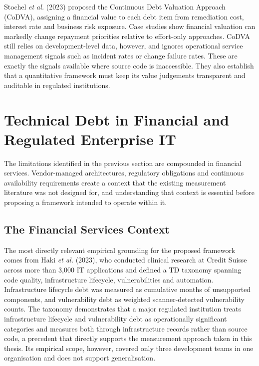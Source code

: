 \documentclass[
  12pt,
  letterpaper,
  12pt,
  oneside,
  english,
  onehalfspacing,
  headsepline]{MastersDoctoralThesis}
\begin{document}
Stochel \emph{et al.} (2023) proposed the Continuous Debt Valuation
Approach (CoDVA), assigning a financial value to each debt item from
remediation cost, interest rate and business risk exposure. Case studies
show financial valuation can markedly change repayment priorities
relative to effort-only approaches. CoDVA still relies on
development-level data, however, and ignores operational service
management signals such as incident rates or change failure rates. These
are exactly the signals available where source code is inaccessible.
They also establish that a quantitative framework must keep its value
judgements transparent and auditable in regulated institutions.

\section{Technical Debt in Financial and Regulated Enterprise
IT}\label{technical-debt-in-financial-and-regulated-enterprise-it}

The limitations identified in the previous section are compounded in
financial services. Vendor-managed architectures, regulatory obligations
and continuous availability requirements create a context that the
existing measurement literature was not designed for, and understanding
that context is essential before proposing a framework intended to
operate within it.

\subsection{The Financial Services
Context}\label{the-financial-services-context}

The most directly relevant empirical grounding for the proposed
framework comes from Haki \emph{et al.} (2023), who conducted clinical
research at Credit Suisse across more than 3,000 IT applications and
defined a TD taxonomy spanning code quality, infrastructure lifecycle,
vulnerabilities and automation. Infrastructure lifecycle debt was
measured as cumulative months of unsupported components, and
vulnerability debt as weighted scanner-detected vulnerability counts.
The taxonomy demonstrates that a major regulated institution treats
infrastructure lifecycle and vulnerability debt as operationally
significant categories and measures both through infrastructure records
rather than source code, a precedent that directly supports the
measurement approach taken in this thesis. Its empirical scope, however,
covered only three development teams in one organisation and does not
support generalisation.
\end{document}
